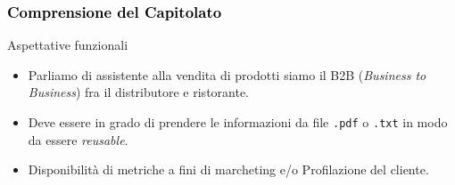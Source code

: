 \documentclass{beamer}
\begin{document}




\begin{frame}
    \frametitle{\textcolor{black}{Comprensione del Capitolato}}
        \begin{block}{Aspettative funzionali}
            \begin{itemize}
                \item Parliamo di assistente alla vendita di prodotti siamo il B2B (\textit{Business to Business}) fra il distributore e ristorante.
                \item Deve essere in grado di prendere le informazioni da file \texttt{.pdf} o \texttt{.txt} in modo da essere \textit{reusable}.
                \item Disponibilità di metriche a fini di marcheting e/o Profilazione del cliente.
            \end{itemize}
        \end{block}
\end{frame}
\end{document}
